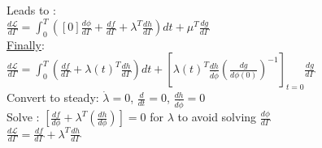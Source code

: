 \documentclass[10pt]{article} %
\begin{document}
\begin{center}
	Leads to :\\
	$\frac{d \mathcal{L}}{d\Gamma} = \int_{0}^{T} \left(\left[0\right]\frac{d \phi}{d\Gamma} + \frac{df}{d\Gamma} + \lambda^T \frac{dh}{d\Gamma}\right)dt + \mu^T \frac{dg}{d\Gamma}$\\
	\underline{Finally}:\\
	$\frac{d \mathcal{L}}{d\Gamma} = \int_{0}^{T} \left(\frac{df}{d\Gamma} + \lambda(t)^T \frac{dh}{d\Gamma}\right)dt + \left[ \lambda(t)^T \frac{dh}{d\dot \phi} \left( \frac{d g}{d\phi(0)} \right)^{-1} \right]_{t=0} \frac{dg}{d\Gamma}$\\$ $\\$ $\\
	Convert to steady: $\dot \lambda = 0$, $\frac{d}{dt} = 0$, $\frac{dh}{d \dot \phi} = 0$\\
	Solve : $\left[\frac{df}{d\phi} + \lambda^T \left( \frac{dh}{d\phi} \right) \right]=0$ for $\lambda$ to avoid solving $\frac{d\phi}{d\Gamma}$\\$ $\\
	$\frac{d \mathcal{L}}{d\Gamma} = \frac{df}{d\Gamma} + \lambda^T \frac{dh}{d\Gamma} $\\
\end{center}
\newpage
\end{document}
